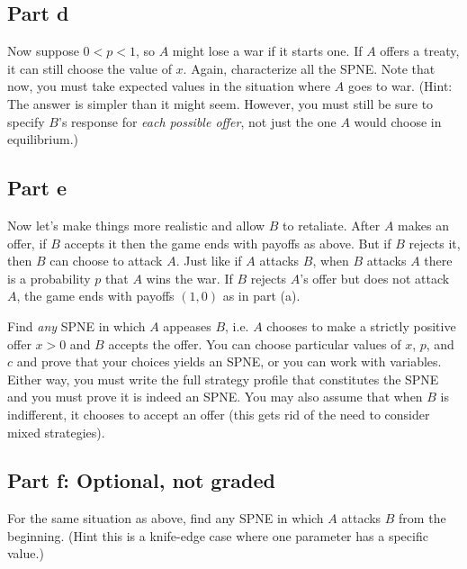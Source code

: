 \documentclass[10pt]{article}
\begin{document}
\newpage

\subsection*{Part d} Now suppose $0<p<1$, so $A$ might lose a war if it starts one. If $A$ offers a treaty, it can still choose the value of $x$. Again, characterize all the SPNE. Note that now, you must take expected values in the situation where $A$ goes to war. (Hint: The answer is simpler than it might seem. However, you must still be sure to specify $B$'s response for \emph{each possible offer}, not just the one $A$ would choose in equilibrium.)

\newpage

\subsection*{Part e} Now let's make things more realistic and allow $B$ to retaliate. After $A$ makes an offer, if $B$ accepts it then the game ends with payoffs as above. But if $B$ rejects it, then $B$ can choose to attack $A$. Just like if $A$ attacks $B$, when $B$ attacks $A$ there is a probability $p$ that $A$ wins the war. If $B$ rejects $A$'s offer but does not attack $A$, the game ends with payoffs $(1,0)$ as in part (a).

Find \emph{any} SPNE in which $A$ appeases $B$, i.e. $A$ chooses to make a strictly positive offer $x>0$ and $B$ accepts the offer. You can choose particular values of $x$, $p$, and $c$ and prove that your choices yields an SPNE, or you can work with variables. Either way, you must write the full strategy profile that constitutes the SPNE and you must prove it is indeed an SPNE. You may also assume that when $B$ is indifferent, it chooses to accept an offer (this gets rid of the need to consider mixed strategies).

\newpage

\subsection*{Part f: Optional, not graded} For the same situation as above, find any SPNE in which $A$ attacks $B$ from the beginning. (Hint this is a knife-edge case where one parameter has a specific value.)
\end{document}
